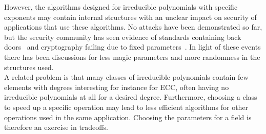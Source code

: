However, the algorithms designed for irreducible polynomials with specific exponents may contain internal structures with an unclear impact on security of applications that use these algorithms. No attacks have been demonstrated so far, but the security community has seen evidence of standards containing back doors~\cite{bernstein2016dual} and cryptography failing due to fixed parameters~\cite{adrian2015imperfect}. In light of these events there has been discussions for less magic parameters and more randomness in the structures used.\\

A related problem is that many classes of irreducible polynomials contain few elements with degrees interesting for instance for ECC, often having no irreducible polynomials at all for a desired degree. Furthermore, choosing a class to speed up a specific operation may lead to less efficient algorithms for other operations used in the same application. Choosing the parameters for a field is therefore an exercise in tradeoffs.

%
%
%
%
